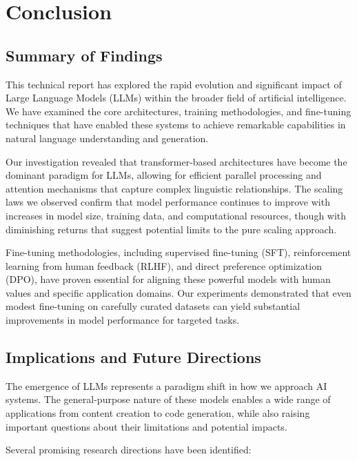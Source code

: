 \documentclass[11pt,a4paper]{report}
\begin{document}
\chapter{Conclusion}

\section{Summary of Findings}

This technical report has explored the rapid evolution and significant impact of Large Language Models (LLMs) within the broader field of artificial intelligence. We have examined the core architectures, training methodologies, and fine-tuning techniques that have enabled these systems to achieve remarkable capabilities in natural language understanding and generation.

Our investigation revealed that transformer-based architectures have become the dominant paradigm for LLMs, allowing for efficient parallel processing and attention mechanisms that capture complex linguistic relationships. The scaling laws we observed confirm that model performance continues to improve with increases in model size, training data, and computational resources, though with diminishing returns that suggest potential limits to the pure scaling approach.

Fine-tuning methodologies, including supervised fine-tuning (SFT), reinforcement learning from human feedback (RLHF), and direct preference optimization (DPO), have proven essential for aligning these powerful models with human values and specific application domains. Our experiments demonstrated that even modest fine-tuning on carefully curated datasets can yield substantial improvements in model performance for targeted tasks.

\section{Implications and Future Directions}

The emergence of LLMs represents a paradigm shift in how we approach AI systems. The general-purpose nature of these models enables a wide range of applications from content creation to code generation, while also raising important questions about their limitations and potential impacts.

Several promising research directions have been identified:
\end{document}
